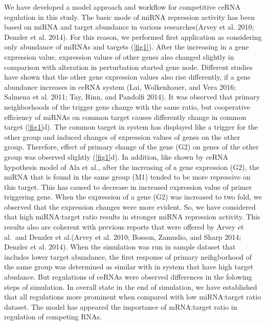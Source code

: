 \documentclass[]{article}
\begin{document}
We have developed a model approach and workflow for competitive ceRNA
regulation in this study. The basic mode of miRNA repression activity
has been based on miRNA and target abundance in various researches(Arvey
et al. 2010; Denzler et al. 2014). For this reason, we performed first
application as considering only abundance of miRNAs and targets
(\autoref{fig1}). After the increasing in a gene expression value,
expression values of other genes also changed slightly in comparison
with alteration in perturbation started gene node. Different studies
have shown that the other gene expression values also rise differently,
if a gene abundance increases in ceRNA system (Lai, Wolkenhauer, and
Vera 2016; Salmena et al. 2011; Tay, Rinn, and Pandolfi 2014). It was
observed that primary neighborhoods of the trigger gene change with the
same ratio, but cooperative efficiency of miRNAs on common target causes
differently change in common target (\autoref{fig1}d). The common target
in system has displayed like a trigger for the other group and induced
changes of expression values of genes on the other group. Therefore,
effect of primary change of the gene (G2) on genes of the other group
was observed slightly (\autoref{fig1}d). In addition, like shown by
ceRNA hypothesis model of Ala et al., after the increasing of a gene
expression (G2), the miRNA that is found in the same group (M1) tended
to be more repressive on this target. This has caused to decrease in
increased expression value of primer triggering gene. When the
expression of a gene (G2) was increased to two fold, we observed that
the expression changes were more evident. So, we have considered that
high miRNA:target ratio results in stronger miRNA repression activity.
This results also are coherent with previous reports that were offered
by Arvey et al.~and Denzler et al.(Arvey et al. 2010; Bosson, Zamudio,
and Sharp 2014; Denzler et al. 2014). When the simulation was run in
sample dataset that includes lower target abundance, the first response
of primary neihgborhood of the same group was determined as similar with
in system that have high target abudance. But regulations of ceRNAs were
observed differences in the folowing steps of simulation. In overall
state in the end of simulation, we have established that all regulations
more prominent when compared with low miRNA:target ratio dataset. The
model has appeared the importance of mRNA:target ratio in regulation of
competing RNAs.
\end{document}
